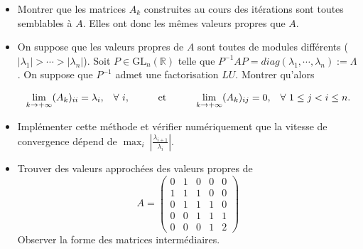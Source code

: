 \documentclass[10pt,a4paper]{article}
\def\1{{\rm 1\kern-.8ex 1}}
\begin{document}
\begin{itemize}

\item Montrer que les matrices $A_k$ construites au cours des itérations sont toutes semblables à $A$. Elles ont donc les mêmes valeurs propres que $A$. 

\item On suppose que les valeurs propres de $A$ sont toutes de
	modules différents ($|\lambda_1|>\cdots>|\lambda_n|$). Soit
	$P\in\mathrm{GL}_n(\mathbb{R})$ telle que $P^{-1}AP=diag(\lambda_1,\cdots,\lambda_n):=\Lambda$. On suppose que $P^{-1}$ admet une factorisation $LU$. Montrer qu'alors

$$\lim_{k\rightarrow +\infty} (A_k)_{ii} =\lambda_i,\hspace{0.3cm}\forall \  i,\hspace{1cm}\hbox{et}\hspace{1cm} \lim_{k\rightarrow +\infty} (A_k)_{ij} = 0,\hspace{0.3cm}\forall \ 1\leq j<i \leq n.$$

\item Implémenter cette méthode et vérifier numériquement que la vitesse de convergence dépend de $\max_i \ | \frac{\lambda_{i+1}}{\lambda_i} |$.

\item
Trouver des valeurs approchées 
des valeurs propres de 
 \[A=\left(\begin{array}{ccccc}
0&1&0&0&0\\1&1&1&0&0\\0&1&1&1&0\\0&0&1&1&1\\0&0&0&1&2
\end{array}\right)\]
Observer la forme des matrices intermédiaires.


\end{itemize}

\eexer
\end{document}
